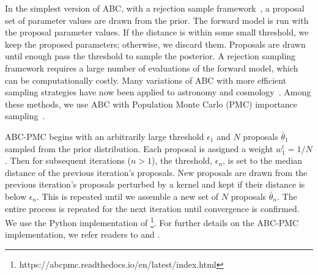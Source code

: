 In the simplest version of ABC, with a rejection sample
framework~\citep{pritchard1999}, a proposal set of parameter values are drawn
from the prior. The forward model is run with the proposal parameter values.
If the distance is within some small threshold, we keep the proposed
parameters; otherwise, we discard them.  Proposals are
drawn until enough pass the threshold to sample the posterior. A
rejection sampling framework requires a large number of evaluations of the
forward model, which
can be computationally costly. Many variations of ABC with more efficient
sampling strategies have now been applied to astronomy and
cosmology~\citep[\eg][]{cameron2012, weyant2013, ishida2015, lin2016, alsing2018}.
Among these methods, we use ABC with Population Monte Carlo (PMC) 
importance sampling~\citep{hahn2017a, hahn2017b, hahn2019a}.

ABC-PMC begins with an arbitrarily large threshold $\epsilon_1$ and $N$ proposals 
$\bar{\theta}_1$ sampled from the prior distribution. Each proposal is
assigned a weight $w^i_1 = 1/N$. Then for subsequent iterations ($n > 1$), the 
threshold, $\epsilon_n$, is set to the median distance of the previous iteration's
proposals. New proposals are drawn from the previous iteration's proposals perturbed 
by a kernel and kept if their distance is below $\epsilon_n$. This is repeated
until we assemble a new set of $N$ proposals $\bar{\theta}_n$. The entire
process is repeated for the next iteration until convergence is confirmed. 
We use the Python implementation of
\cite{akeret2015}\footnote{https://abcpmc.readthedocs.io/en/latest/index.html}.
For further details on the ABC-PMC implementation, we refer readers to \cite{hahn2017b}
and \cite{hahn2019a}.

